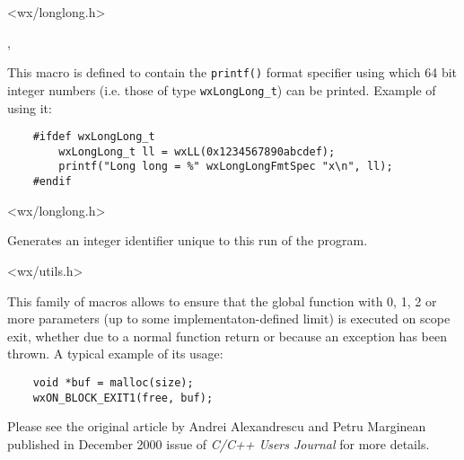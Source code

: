 
<wx/longlong.h>


, 


\label{wxlonglongfmtspec}

This macro is defined to contain the {\tt printf()} format specifier using
which 64 bit integer numbers (i.e. those of type {\tt wxLongLong\_t}) can be
printed. Example of using it:

\begin{verbatim}
    #ifdef wxLongLong_t
        wxLongLong_t ll = wxLL(0x1234567890abcdef);
        printf("Long long = %" wxLongLongFmtSpec "x\n", ll);
    #endif
\end{verbatim}




<wx/longlong.h>


\label{wxnewid}


Generates an integer identifier unique to this run of the program.


<wx/utils.h>


\label{wxonblockexit}


This family of macros allows to ensure that the global function 
with 0, 1, 2 or more parameters (up to some implementaton-defined limit) is
executed on scope exit, whether due to a normal function return or because an
exception has been thrown. A typical example of its usage:
\begin{verbatim}
    void *buf = malloc(size);
    wxON_BLOCK_EXIT1(free, buf);
\end{verbatim}

Please see the original article by Andrei Alexandrescu and Petru Marginean
published in December 2000 issue of \emph{C/C++ Users Journal} for more
details.


